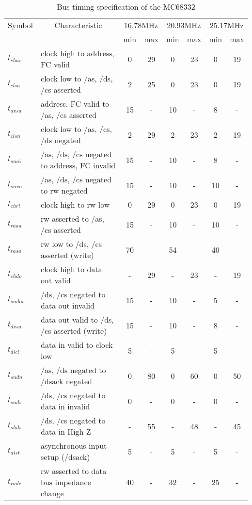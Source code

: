 \documentclass[12pt]{article}
\begin{document}
\begin{table}
\begin{center}
\scriptsize
\begin{tabular}{|l|l||c|c||c|c||c|c|}
\hline
Symbol & \multicolumn{1}{c||}{Characteristic} & \multicolumn{2}{c||}{16.78MHz} &
\multicolumn{2}{c||}{20.93MHz} & \multicolumn{2}{c|}{25.17MHz} \\
&& min & max & min & max & min & max \\ \hline\hline
$t_{chav}$ & clock high to address, FC valid & 0 & 29 & 0 & 23 & 0 &
19 \\ \hline
$t_{clsa}$ & clock low to /as, /ds, /cs asserted & 2 & 25 & 0 & 23 & 0
& 19 \\\hline
$t_{avsa}$ & address, FC valid to /as, /cs asserted & 15 & - & 10 & -&
8 & - \\\hline
$t_{clsn}$ & clock low to /as, /cs, /ds negated & 2 & 29 & 2 & 23 & 2
& 19 \\\hline
$t_{snai}$ & /as, /ds, /cs negated to address, FC invalid & 15 & - & 
10 & - & 8 & - \\ \hline
$t_{snrn}$ & /as, /ds, /cs negated to rw negated & 15 & - & 10 & -
& 10 & - \\ \hline
$t_{chrl}$ & clock high to rw low & 0 & 29 & 0 & 23 & 0 & 19 \\ \hline
$t_{raaa}$ & rw asserted to /as, /cs asserted & 15 & - & 10 & - & 10 &
- \\
\hline
$t_{rasa}$ & rw low to /ds, /cs asserted (write) & 70 & - & 54 & -
& 40 & - \\ \hline
$t_{chdo}$ & clock high to data out valid & - & 29 & - & 23 & - & 19 \\
\hline
$t_{sndoi}$ & /ds, /cs negated to data out invalid & 15 & - & 10 & -
& 5 & - \\ \hline
$t_{dvsa}$ & data out valid to /ds, /cs asserted (write) & 15 & - & 10
& - & 8 & - \\ \hline
$t_{dicl}$ & data in valid to clock low & 5 & - & 5 & - & 5 & - \\ \hline
$t_{sndn}$ & /as, /ds negated to /dsack negated & 0 & 80 & 0 & 60 & 0
& 50 \\
\hline
$t_{sndi}$ & /ds, /cs negated to data in invalid & 0 & - & 0 & - & 0 &
- \\
\hline
$t_{shdi}$ & /ds, /cs negated to data in High-Z & - & 55 & - & 48 & -
& 45 \\
\hline
$t_{aist}$ & asynchronous input setup (/dsack) & 5 & - & 5 & - & 5 & -
\\
\hline
$t_{radc}$ & rw asserted to data bus impedance change & 40 & - & 32 &
- & 25 & - \\ \hline
\end{tabular}
\caption{\label{proc-tim} Bus timing specification of the MC68332}
\end{center}
\end{table}
\end{document}
